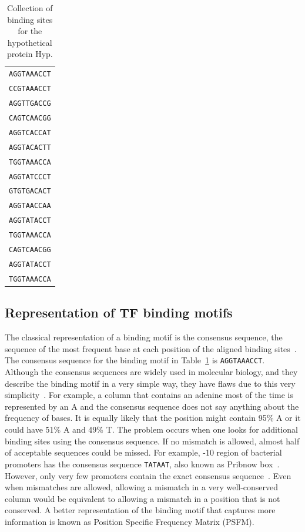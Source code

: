 \begin{table}[h]
  \centering
  \caption{Collection of binding sites for the hypothetical protein Hyp.}
  \label{tab:lexa-motif}
  \begin{tabular}{c}
\texttt{AGGTAAACCT}\\
\texttt{CCGTAAACCT}\\
\texttt{AGGTTGACCG}\\
\texttt{CAGTCAACGG}\\
\texttt{AGGTCACCAT}\\
\texttt{AGGTACACTT}\\
\texttt{TGGTAAACCA}\\
\texttt{AGGTATCCCT}\\
\texttt{GTGTGACACT}\\
\texttt{AGGTAACCAA}\\
\texttt{AGGTATACCT}\\
\texttt{TGGTAAACCA}\\
\texttt{CAGTCAACGG}\\
\texttt{AGGTATACCT}\\
\texttt{TGGTAAACCA}
   \end{tabular}
\end{table}


\subsection{Representation of TF binding motifs}

The classical representation of a binding motif is the consensus sequence, the
sequence of the most frequent base at each position of the aligned binding
sites~\cite{pierce2012genetics}. The consensus sequence for the binding motif
in Table~\ref{tab:lexa-motif} is \texttt{AGGTAAACCT}. Although the consensus
sequences are widely used in molecular biology, and they describe the binding
motif in a very simple way, they have flaws due to this very
simplicity~\cite{schneider2002consensus}. For example, a column that contains
an adenine most of the time is represented by an A and the consensus sequence
does not say anything about the frequency of bases. It is equally likely that
the position might contain 95\% A or it could have 51\% A and 49\% T. The
problem occurs when one looks for additional binding sites using the consensus
sequence.  If no mismatch is allowed, almost half of acceptable sequences could
be missed. For example, -10 region of bacterial promoters has the consensus
sequence \texttt{TATAAT}, also known as Pribnow
box~\cite{pribnow1975nucleotide}. However, only very few promoters contain the
exact consensus sequence~\cite{lisser1993compilation}. Even when mismatches are
allowed, allowing a mismatch in a very well-conserved column would be
equivalent to allowing a mismatch in a position that is not conserved. A better
representation of the binding motif that captures more information is known as
Position Specific Frequency Matrix (PSFM).

